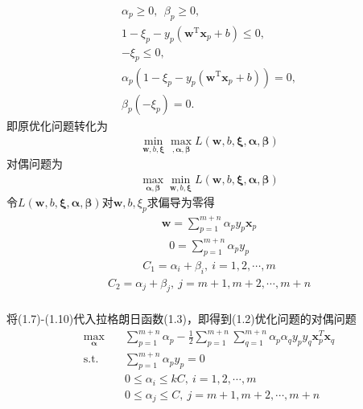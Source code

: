 \documentclass{article}
\begin{document}
\begin{equation}
    	\label{eq-svm-la}
    	\begin{split}
    	\alpha_p\geq 0,\ \ \beta_p\geq 0,\\
		1-\xi_p-y_p(\mathbf{w}^\mathrm{T}\mathbf{x}_p + b)\leq 0,\\
		-\xi_p\leq 0,\\
		\alpha_p(1-\xi_p-y_p(\mathbf{w}^\mathrm{T}\mathbf{x}_p + b))=0,\\
		\beta_p(-\xi_p)=0.
    	\end{split}
    \end{equation}
即原优化问题转化为
\begin{equation}
    	\begin{split}
			\min_{\bm{w},b,\bm{\xi}}\max_{,\bm{\alpha},\bm{\beta}}L(\bm{w},b,\bm{\xi},\bm{\alpha},\bm{\beta})
    	\end{split}
\end{equation}
对偶问题为
\begin{equation}
    	\begin{split}
			\max_{\bm{\alpha},\bm{\beta}}\min_{\bm{w},b,\bm{\xi}}L(\bm{w},b,\bm{\xi},\bm{\alpha},\bm{\beta})
    	\end{split}
\end{equation}
令$L(\bm{w},b,\bm{\xi},\bm{\alpha},\bm{\beta})$对$\bm{w},b,\xi_p$求偏导为零得
\begin{equation}
    	\begin{split}
			\bm{w}=\sum_{p=1}^{m+n}\alpha_py_p\bm{x}_p
    	\end{split}
\end{equation}
\begin{equation}
    	\begin{split}
			0=\sum_{p=1}^{m+n}\alpha_py_p
    	\end{split}
\end{equation}
\begin{equation}
    	\begin{split}
			C_1=\alpha_i+\beta_i,\ i=1,2,\cdots,m
    	\end{split}
\end{equation}
\begin{equation}
    	\begin{split}
			C_2=\alpha_j+\beta_j,\ j=m+1,m+2,\cdots,m+n
    	\end{split}
\end{equation}
\\将(1.7)-(1.10)代入拉格朗日函数(1.3)，即得到(1.2)优化问题的对偶问题
\begin{equation}
    	\begin{split}
			\max_{\bm{\alpha}}& \quad \sum_{p=1}^{m+n}\alpha_p-\frac{1}{2}\sum_{p=1}^{m+n}\sum_{q=1}^{m+n}\alpha_p\alpha_qy_py_q\bm{x}_p^T\bm{x}_q\\
\text{s.t.}& \quad \sum_{p=1}^{m+n}\alpha_py_p=0\\
    		& \quad 0\leq\alpha_i\leq kC,\ i=1,2,\cdots,m\\
			& \quad 0\leq\alpha_j\leq C, \ j=m+1,m+2,\cdots,m+n\\
    	\end{split}
\end{equation}
	\newpage
\end{document}

